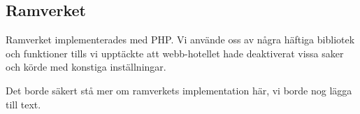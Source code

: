 \subsection{Ramverket}
Ramverket implementerades med PHP. Vi använde oss av några häftiga bibliotek och
funktioner tills vi upptäckte att webb-hotellet hade deaktiverat vissa saker och
körde med konstiga inställningar.

Det borde säkert stå mer om ramverkets implementation här, vi borde nog lägga
till text.
